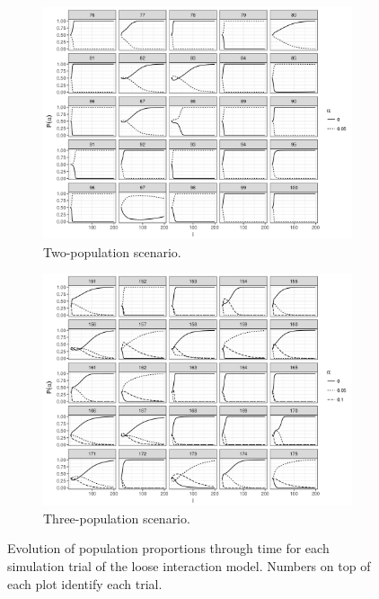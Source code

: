 \documentclass[a4paper]{article}
\begin{document}
\begin{figure}
  \centering
  \begin{subfigure}[]{.9\textwidth}
    \includegraphics[width=\textwidth]{simulation/results/round-3/plots/proportion-cases-0-005-weakest-square.png}
    \caption{Two-population scenario.}
    \label{fig:proportion-cases-two-loose-interaction}
  \end{subfigure}
  \hfill
  \begin{subfigure}[]{.9\textwidth}
    \includegraphics[width=\textwidth]{simulation/results/round-3/plots/proportion-cases-0-005-01-weakest-square.png}
    \caption{Three-population scenario.}
    \label{fig:proportion-cases-three-loose-interaction}
  \end{subfigure}
  \caption{Evolution of population proportions through time for each simulation trial of the loose interaction model. Numbers on top of each plot identify each trial.}
  \label{fig:proportion-cases-loose-interaction}
\end{figure}
\end{document}
